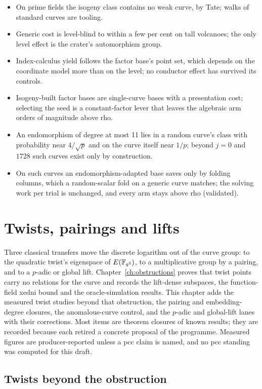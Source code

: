 \begin{itemize}
\item On prime fields the isogeny class contains no weak curve, by Tate;
  walks of standard curves are tooling.
\item Generic cost is level-blind to within a few per cent on tall
  volcanoes; the only level effect is the crater's automorphism group.
\item Index-calculus yield follows the factor base's point set, which
  depends on the coordinate model more than on the level; no conductor
  effect has survived its controls.
\item Isogeny-built factor bases are single-curve bases with a
  presentation cost; selecting the seed is a constant-factor lever that
  leaves the algebraic arm orders of magnitude above rho.
\item An endomorphism of degree at most 11 lies in a random curve's class
  with probability near $4/\sqrt p$ and on the curve itself near $1/p$;
  beyond $j=0$ and $1728$ such curves exist only by construction.
\item On such curves an endomorphism-adapted base saves only by folding
  columns, which a random-scalar fold on a generic curve matches; the
  solving work per trial is unchanged, and every arm stays above rho
  (validated).
\end{itemize}
\chapter{Twists, pairings and lifts}\label{ch:twistspairings}

Three classical transfers move the discrete logarithm out of the curve
group: to the quadratic twist's eigenspace of $E(\mathbb{F}_{q^2})$, to a
multiplicative group by a pairing, and to a $p$-adic or global lift.
Chapter~\ref{ch:obstructions} proves that twist points carry no relations
for the curve and records the lift-dense subspaces, the function-field
xedni bound and the oracle-simulation results. This chapter adds the
measured twist studies beyond that obstruction, the pairing and
embedding-degree closures, the anomalous-curve control, and the $p$-adic
and global-lift lanes with their corrections. Most items are theorem
closures of known results; they are recorded because each retired a
concrete proposal of the programme. Measured figures are producer-reported
unless a pcc claim is named, and no pcc standing was computed for this
draft.

\section{Twists beyond the obstruction}\label{sec:tp-twist}

